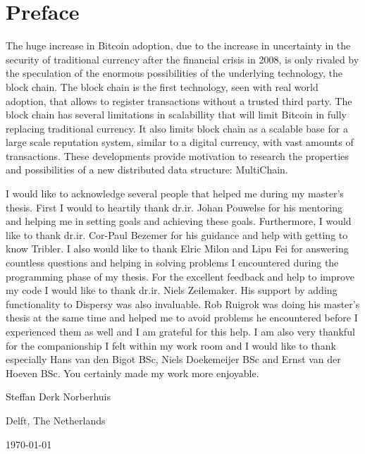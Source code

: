 \chapter*{Preface}
The huge increase in Bitcoin adoption, 
due to the increase in uncertainty in the security of traditional currency 
after the financial crisis in 2008, 
is only rivaled by the speculation of the enormous possibilities 
of the underlying technology, the block chain.
The block chain is the first technology, seen with real world adoption,
that allows to register transactions without a trusted third party.
The block chain has several limitations in scalabillity
that will limit Bitcoin in fully replacing traditional currency.
It also limits block chain as a scalable base for a large scale reputation system,
similar to a digital currency, with vast amounts of transactions.
These developments provide motivation to research the properties and possibilities of a new distributed data structure:
MultiChain.

\vspace{1\baselineskip}

\noindent
I would like to acknowledge several people that helped me during my master's thesis.
First I would to heartily thank dr.ir. Johan Pouwelse for his mentoring and
helping me in setting goals and achieving these goals.
Furthermore, I would like to thank dr.ir. Cor-Paul Bezemer for his guidance and help with getting to know Tribler.
I also would like to thank Elric Milon and Lipu Fei for answering countless questions
and helping in solving problems I encountered during the programming phase of my thesis.
For the excellent feedback and help to improve my code I would like to thank dr.ir. Niels Zeilemaker.
His support by adding functionality to Dispersy was also invaluable.
Rob Ruigrok was doing his master's thesis at the same time
and helped me to avoid problems he encountered before I experienced them as well and
I am grateful for this help.
I am also very thankful for the companionship I felt within my work room 
and I would like to thank especially Hans van den Bigot BSc, Niels Doekemeijer BSc and Ernst van der Hoeven BSc.
You certainly made my work more enjoyable.

\vspace{1\baselineskip}

\noindent
Steffan Derk Norberhuis

\vspace{1\baselineskip}

\noindent
Delft, The Netherlands

\noindent
\today
